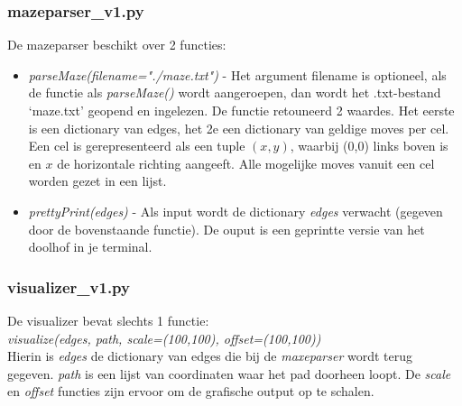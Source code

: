 \documentclass[a4paper]{article}
\begin{document}
\subsubsection{mazeparser\_v1.py}
De mazeparser beschikt over 2 functies:
\begin{itemize}
\item \textit{parseMaze(filename="./maze.txt")} - Het argument filename is optioneel, als de functie als \textit{parseMaze()} wordt aangeroepen, dan wordt het .txt-bestand `maze.txt' geopend en ingelezen. De functie retouneerd 2 waardes. Het eerste is een dictionary van edges, het 2e een dictionary van geldige moves per cel. Een cel is gerepresenteerd als een tuple $(x,y)$, waarbij (0,0) links boven is en $x$ de horizontale richting aangeeft. Alle mogelijke moves vanuit een cel worden gezet in een lijst.
\item \textit{prettyPrint(edges)} - Als input wordt de dictionary \textit{edges} verwacht (gegeven door de bovenstaande functie). De ouput is een geprintte versie van het doolhof in je terminal.
\end{itemize}

\subsubsection{visualizer\_v1.py}
De visualizer bevat slechts 1 functie: \\
\textit{visualize(edges, path, scale=(100,100), offset=(100,100))}\\
Hierin is \textit{edges} de dictionary van edges die bij de \textit{maxeparser} wordt terug gegeven. \textit{path} is een lijst van coordinaten waar het pad doorheen loopt. De \textit{scale} en \textit{offset} functies zijn ervoor om de grafische output op te schalen.
\end{document}

